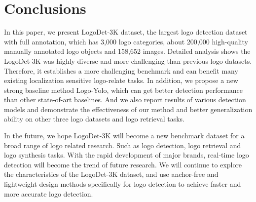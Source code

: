 \documentclass[journal]{IEEEtran}
\begin{document}
\section{Conclusions}
In this paper, we present LogoDet-3K dataset, the largest  logo detection dataset with full annotation, which has 3,000 logo categories, about 200,000 high-quality manually annotated logo objects and 158,652 images. Detailed analysis shows the LogoDet-3K was highly diverse and more challenging than previous logo datasets. Therefore, it establishes a more challenging benchmark and can benefit many existing localization sensitive logo-relate tasks. In addition, we propose a new strong baseline method Logo-Yolo, which can get better detection performance than other state-of-art baselines. And we also report results of various detection models and demonstrate the effectiveness of our method and better generalization ability on other three logo datasets and logo retrieval tasks. 

In the future, we hope LogoDet-3K will become a new benchmark dataset for a broad range of logo related research. Such as logo detection, logo retrieval and logo synthesis tasks. With the rapid development of major brands, real-time logo detection will become the trend of future research. We will continue to explore the characteristics of the LogoDet-3K dataset, and use anchor-free and lightweight design methods specifically for logo detection to achieve faster and more accurate logo detection.

  
\end{document}
